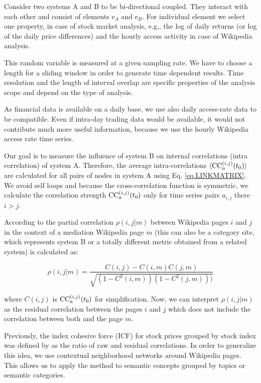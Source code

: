 \documentclass[a4paper,10pt]{scrbook}
\begin{document}

Consider two systems A and B to be bi-directional coupled. They interact with each other and consist of elements e$_A$ and e$_B$. For individual element we select one property, in case of stock market analysis, e.g., the log of daily returns (or log of the daily price differences) and the hourly access activity in case of Wikipedia analysis. 

This random variable is measured at a given sampling rate. We have to choose a length for a sliding window in order to generate time dependent results. Time resolution and the length of interval overlap are specific properties of the analysis scope and depend on the type of analysis. 

As financial data is available on a daily base, we use also daily access-rate data to be compatible. Even if intra-day trading data would be available, it would not contribute much more useful information, because we use the hourly Wikipedia access rate time series. 

Our goal is to measure the influence of system B on internal correlations (intra correlation) of system A. Therefore, the average intra-correlations $\langle {\rm CC}_a^{(i,j)}(t_0) \rangle$ are calculated for all pairs of nodes in system A using Eq. \ref{eq.LINKMATRIX}. We avoid self loops and because the cross-correlation function is symmetric, we calculate the correlation strength ${\rm CC}_a^{(i,j)}(t_0)$ only for time series pairs $a_{i,j}$ there $i > j$.

According to \cite{Kenett2011} the partial correlation $\rho(i,j|m)$ between Wikipedia pages $i$ and $j$ in the context of a mediation Wikipedia page $m$ (this can also be a category site, which represents system B or a totally different metric obtained from a related system) is calculated as:

\begin{equation}
\rho(i,j|m) = \frac{C(i,j)-C(i,m)C(j,m)}{\sqrt{(1-C^{2}(i,m))(1-C^{2}(j,m)))}}
\end{equation}

where $C(i,j)$ is ${\rm CC}_a^{(i,j)}(t_0)$ for simplification.
Now, we can interpret $\rho(i,j|m)$ as the residual correlation between the pages $i$ and $j$ which does not include the correlation between both and the page $m$. 

Previously, the index cohesive force (ICF) for stock prices grouped by stock index was defined by \cite{Kenett2011} as the ratio of raw and residual correlations. In order to generalize this idea, we use contextual neighborhood networks around Wikipedia pages. This allows us to apply the method to semantic concepts grouped by topics or semantic categories. 
\end{document}
